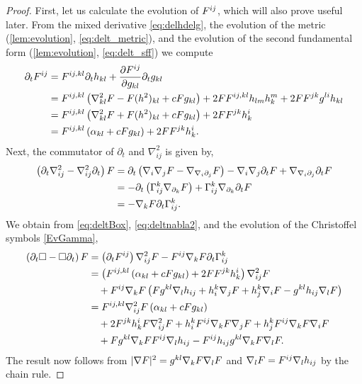 \documentclass{amsart}
\begin{document}
\begin{proof}
First, let us calculate the evolution of \(F^{ij}\), which will also prove useful later. From the mixed derivative \cref{eq:delhdelg}, the evolution of the metric (\cref{lem:evolution}, \cref{eq:delt_metric}), and the evolution of the second fundamental form (\cref{lem:evolution}, \cref{eq:delt_sff}) we compute
\begin{equation}
\label{eq:deltBox}
\begin{split}
\partial_{t} F^{ij} &= F^{ij,kl} \partial_t h_{kl} + \frac{\partial F^{ij}}{\partial g_{kl}} \partial_t g_{kl} \\
&= F^{ij,kl} \left(\nabla^2_{kl} F - F(h^2)_{kl} + c F g_{kl}\right) + 2F F^{ij,kl} h_{lm}h^{m}_{k} + 2FF^{jk}g^{li}h_{kl} \\
&= F^{ij,kl} \left(\nabla^2_{kl} F + F(h^2)_{kl} + c F g_{kl}\right) + 2FF^{jk}h^{i}_{k} \\
&= F^{ij,kl} \left(\alpha_{kl} + c F g_{kl}\right) + 2FF^{jk}h^{i}_{k}.
\end{split}
\end{equation}
Next, the commutator of \(\partial_t\) and \(\nabla^2_{ij}\) is given by,
\begin{equation}
\label{eq:deltnabla2}
\begin{split}
\left(\partial_{t}\nabla^2_{ij} - \nabla^2_{ij}\partial_{t}\right) F &= \partial_t \left(\nabla_i \nabla_j F - \nabla_{\nabla_i \partial_j} F\right) - \nabla_i \nabla_j \partial_t F + \nabla_{\nabla_i \partial_j} \partial_t F \\
&= - \partial_t \left(\Gamma_{ij}^k \nabla_{\partial_k} F\right) + \Gamma_{ij}^k \nabla_{\partial_k} \partial_t F \\
&= - \nabla_k F \partial_t \Gamma_{ij}^k.
\end{split}
\end{equation}
We obtain from \eqref{eq:deltBox}, \eqref{eq:deltnabla2}, and the evolution of the Christoffel symbols \cref{EvGamma},
\[
\begin{split}
\left(\partial_{t}\Box - \Box\partial_{t}\right) F &= \left(\partial_{t}F^{ij}\right) \nabla^2_{ij} F - F^{ij}\nabla_k F\partial_t \Gamma^{k}_{ij} \\
&= \left(F^{ij,kl} \left(\alpha_{kl} + c F g_{kl}\right) + 2FF^{jk}h^{i}_{k}\right) \nabla^2_{ij} F \\
&\quad + F^{ij} \nabla_k F \left(F g^{kl} \nabla_l h_{ij} + h^k_i \nabla_j F + h^k_j \nabla_i F - g^{kl} h_{ij} \nabla_l F\right) \\
&= F^{ij,kl} \nabla^2_{ij} F \left(\alpha_{kl} + c F g_{kl}\right) \\
&\quad + 2F^{jk}h^{i}_{k}F \nabla^2_{ij} F + h^k_i F^{ij} \nabla_k F \nabla_j F + h^k_j F^{ij} \nabla_k F \nabla_i F \\
&\quad + F g^{kl}\nabla_k F F^{ij} \nabla_l h_{ij} - F^{ij} h_{ij} g^{kl}\nabla_k F \nabla_l F.
\end{split}
\]
The result now follows from \(|\nabla F|^2 = g^{kl}\nabla_k F \nabla_l F\) and \(\nabla_l F = F^{ij} \nabla_l h_{ij}\) by the chain rule.
\end{proof}
\end{document}
